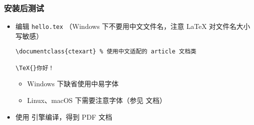
\begin{frame}[fragile]
  \frametitle{安装后测试}

  \begin{itemize}
    \item 编辑 \texttt{hello.tex} （Windows 下不要用中文文件名，注意
      \LaTeX{} 对文件名大小写敏感）
      \lstset{language=[LaTeX]TeX}
      \begin{card} \begin{lstlisting}[basicstyle=\ttfamily]
\documentclass{ctexart} % 使用中文适配的 article 文档类

\TeX{}你好！

        \end{lstlisting}\end{card}
      \begin{itemize}
        \item Windows 下缺省使用中易字体
        \item Linux、macOS 下需要注意字体（参见  文档）
      \end{itemize}
    \item 使用 \XeLaTeX{} 引擎编译，得到 PDF 文档
      \begin{center}
      \end{center}
  \end{itemize}
\end{frame}

